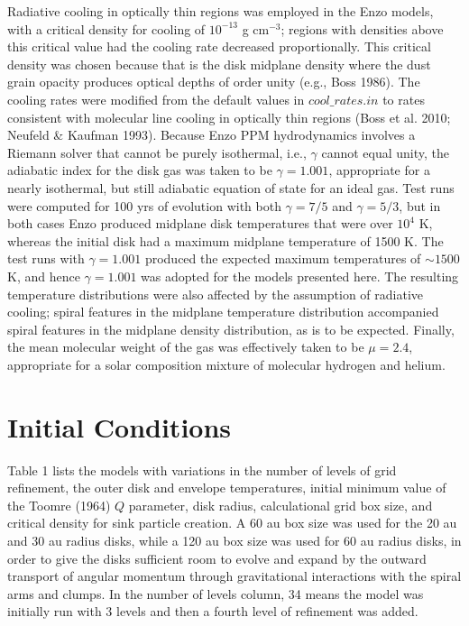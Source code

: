 \documentclass[12pt,preprint]{aastex}
\begin{document}
 Radiative cooling in optically thin regions was employed in the Enzo models, with a critical density 
for cooling of  $10^{-13}$ g cm$^{-3}$; regions with densities above this critical value had the cooling 
rate decreased proportionally. This critical density was chosen because that is the disk midplane
density where the dust grain opacity produces optical depths of order unity (e.g., Boss 1986).
The cooling rates were modified from the default values in $cool\_rates.in$ to rates consistent
with molecular line cooling in optically thin regions (Boss et al. 2010; Neufeld \& Kaufman 1993).
Because Enzo PPM hydrodynamics involves a Riemann solver that cannot be purely isothermal,
i.e., $\gamma$ cannot equal unity, the adiabatic index for the disk gas was taken to be 
$\gamma = 1.001$, appropriate for a nearly isothermal, but still adiabatic equation of state for 
an ideal gas. Test runs were computed for 100 yrs of evolution with both $\gamma = 7/5$
and $\gamma = 5/3$, but in both cases Enzo produced midplane disk temperatures that were 
over $10^4$ K, whereas the initial disk had a maximum midplane temperature of 1500 K. 
The test runs with $\gamma = 1.001$ produced the expected maximum temperatures of
$\sim 1500$ K, and hence $\gamma = 1.001$ was adopted for the models presented here.
The resulting temperature distributions were also affected by 
the assumption of radiative cooling; spiral features in the midplane temperature distribution 
accompanied spiral features in the midplane density distribution, as is to be expected.
Finally, the mean molecular weight of the gas was effectively taken to be $\mu = 2.4$, 
appropriate for a solar composition mixture of molecular hydrogen and helium.

\section{Initial Conditions}

 Table 1 lists the models with variations in the number of levels of grid refinement, the outer disk 
and envelope temperatures, initial minimum value of the Toomre (1964) $Q$ parameter,
disk radius, calculational grid box size, and critical density for sink
particle creation. A 60 au box size was used for the 20 au and 30 au radius disks, while a 120 au box size 
was used for 60 au radius disks, in order to give the disks sufficient room to evolve and expand
by the outward transport of angular momentum through gravitational interactions with the
spiral arms and clumps. In the number of levels column, 34 means the model was initially
run with 3 levels and then a fourth level of refinement was added.
\end{document}
